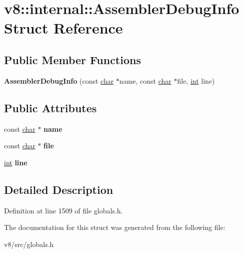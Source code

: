 \hypertarget{structv8_1_1internal_1_1AssemblerDebugInfo}{}\section{v8\+:\+:internal\+:\+:Assembler\+Debug\+Info Struct Reference}
\label{structv8_1_1internal_1_1AssemblerDebugInfo}
\subsection*{Public Member Functions}
\begin{DoxyCompactItemize}
\item 
\mbox{\label{structv8_1_1internal_1_1AssemblerDebugInfo_a60a8bf6106e9e6821635506347449756}} 
{\bfseries Assembler\+Debug\+Info} (const \mbox{\hyperlink{classchar}{char}} $\ast$name, const \mbox{\hyperlink{classchar}{char}} $\ast$file, \mbox{\hyperlink{classint}{int}} line)
\end{DoxyCompactItemize}
\subsection*{Public Attributes}
\begin{DoxyCompactItemize}
\item 
\mbox{\label{structv8_1_1internal_1_1AssemblerDebugInfo_a58f30052a502ef6d8f43288b391d3fb4}} 
const \mbox{\hyperlink{classchar}{char}} $\ast$ {\bfseries name}
\item 
\mbox{\label{structv8_1_1internal_1_1AssemblerDebugInfo_a57f9bdd3425a5017f853e7e8769a84f4}} 
const \mbox{\hyperlink{classchar}{char}} $\ast$ {\bfseries file}
\item 
\mbox{\label{structv8_1_1internal_1_1AssemblerDebugInfo_a55f89e1c8072751c876f72931f023d48}} 
\mbox{\hyperlink{classint}{int}} {\bfseries line}
\end{DoxyCompactItemize}


\subsection{Detailed Description}


Definition at line 1509 of file globals.\+h.



The documentation for this struct was generated from the following file\+:\begin{DoxyCompactItemize}
\item 
v8/src/globals.\+h\end{DoxyCompactItemize}
